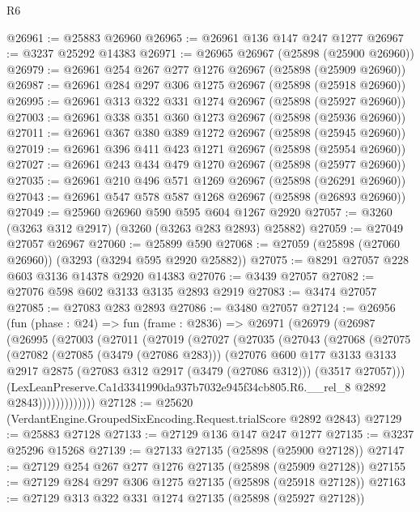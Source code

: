 \begin{lexlean}{R6}
\begin{coremodule}
@26961 := @25883 @26960
@26965 := @26961 @136 @147 @247 @1277
@26967 := @3237 @25292 @14383
@26971 := @26965 @26967 (@25898 (@25900 @26960))
@26979 := @26961 @254 @267 @277 @1276 @26967 (@25898 (@25909 @26960))
@26987 := @26961 @284 @297 @306 @1275 @26967 (@25898 (@25918 @26960))
@26995 := @26961 @313 @322 @331 @1274 @26967 (@25898 (@25927 @26960))
@27003 := @26961 @338 @351 @360 @1273 @26967 (@25898 (@25936 @26960))
@27011 := @26961 @367 @380 @389 @1272 @26967 (@25898 (@25945 @26960))
@27019 := @26961 @396 @411 @423 @1271 @26967 (@25898 (@25954 @26960))
@27027 := @26961 @243 @434 @479 @1270 @26967 (@25898 (@25977 @26960))
@27035 := @26961 @210 @496 @571 @1269 @26967 (@25898 (@26291 @26960))
@27043 := @26961 @547 @578 @587 @1268 @26967 (@25898 (@26893 @26960))
@27049 := @25960 @26960 @590 @595 @604 @1267 @2920
@27057 := @3260 (@3263 @312 @2917) (@3260 (@3263 @283 @2893) @25882)
@27059 := @27049 @27057 @26967
@27060 := @25899 @590
@27068 := @27059 (@25898 (@27060 @26960)) (@3293 (@3294 @595 @2920 @25882))
@27075 := @8291 @27057 @228 @603 @3136 @14378 @2920 @14383
@27076 := @3439 @27057
@27082 := @27076 @598 @602 @3133 @3135 @2893 @2919
@27083 := @3474 @27057
@27085 := @27083 @283 @2893
@27086 := @3480 @27057
@27124 := @26956
    (fun (phase : @24) =>
    fun (frame : @2836) =>
    @26971
      (@26979
        (@26987
          (@26995
            (@27003
              (@27011
                (@27019
                  (@27027
                    (@27035
                      (@27043
                        (@27068
                          (@27075
                            (@27082
                              (@27085 (@3479 (@27086 @283)))
                              (@27076
                                @600
                                @177
                                @3133
                                @3133
                                @2917
                                @2875
                                (@27083 @312 @2917 (@3479 (@27086 @312)))
                                (@3517 @27057)))
                            (LexLeanPreserve.Ca1d3341990da937b7032e945f34cb805.R6.__rel_8
                              @2892
                              @2843)))))))))))))
@27128 := @25620 (VerdantEngine.GroupedSixEncoding.Request.trialScore @2892 @2843)
@27129 := @25883 @27128
@27133 := @27129 @136 @147 @247 @1277
@27135 := @3237 @25296 @15268
@27139 := @27133 @27135 (@25898 (@25900 @27128))
@27147 := @27129 @254 @267 @277 @1276 @27135 (@25898 (@25909 @27128))
@27155 := @27129 @284 @297 @306 @1275 @27135 (@25898 (@25918 @27128))
@27163 := @27129 @313 @322 @331 @1274 @27135 (@25898 (@25927 @27128))

\end{coremodule}
\end{lexlean}
